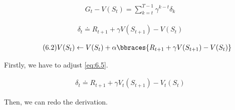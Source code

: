 \begin{solution}

\begin{align} \label{eq:6.6} \tag{6.6}
    G_t - V(S_t)
    =
    \sum_{k=t}^{T-1}
        \gamma^{k-t}
        \delta_k
\end{align}

\begin{align} \label{eq:6.5} \tag{6.5}
    \delta_t
    \doteq
    R_{t+1} + \gamma V(S_{t+1}) - V(S_t)
\end{align}

\begin{align} \label{eq:6.2} \tag{6.2}
    V(S_t)
    \leftarrow
    V(S_t) + \alpha \bbraces{R_{t+1} + \gamma V(S_{t+1}) - V(S_t)}
\end{align}

Firstly, we have to adjust \eqref{eq:6.5}.

\begin{align} \label{eq:6.5'} \tag{6.5$^\prime$}
    \delta_t
    \doteq
    R_{t+1} + \gamma V_t(S_{t+1}) - V_t(S_t)
\end{align}

Then, we can redo the derivation.


\end{solution}
